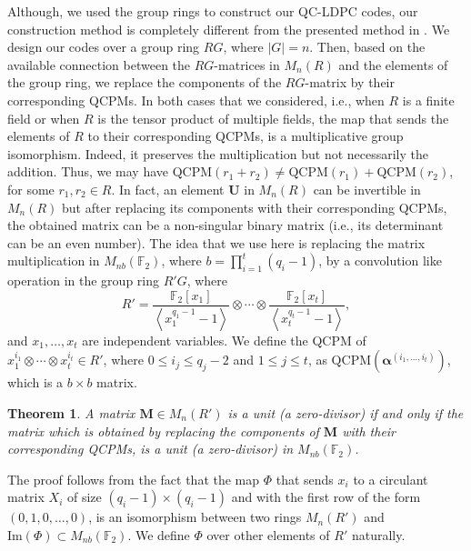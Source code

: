 \documentclass[journal,draftclsnofoot,onecolumn,12pt,twoside]{IEEEtran}
\newtheorem{theorem}{Theorem}
\begin{document}
Although, we  used the group rings to construct our QC-LDPC codes, our  construction method is completely different from the presented method in \cite{1}.  We design our codes over a group ring $RG$, where $|G|=n$. Then, based on the available connection  between the $RG$-matrices in $M_n(R)$ and the elements of the group ring, we replace the components of the $RG$-matrix by their corresponding QCPMs.
In both cases that we considered,  i.e., when $R$ is a finite field or when $R$ is the tensor product of multiple fields, the map that sends the elements of $R$ to their corresponding QCPMs, is a multiplicative group isomorphism. Indeed, it preserves  the multiplication but not necessarily the addition. Thus, we may have $\mathrm{QCPM} (r_1+r_2)\neq \mathrm{QCPM}(r_1)+\mathrm{QCPM}(r_2)$, for some $r_1,r_2\in R$. In fact, an element $\mathbf{U}$ in $M_n(R)$  can be invertible in $M_n(R)$  but after replacing its components with their corresponding QCPMs,  the obtained matrix can be a non-singular binary matrix (i.e., its determinant can be an even number). The idea that we use here is replacing the matrix multiplication in $M_{nb}(\mathbb{F}_2)$, where $b=\prod_{i=1}^t(q_i-1)$, by a convolution like operation in the group ring $R'G$, where
$$R'=\frac{\mathbb{F}_2[x_1]}{\left\langle x_1^{q_1-1}-1\right\rangle} \otimes \cdots\otimes \frac{\mathbb{F}_2[x_t]}{\left\langle x_t^{q_t-1}-1 \right\rangle},$$
and $x_1,\ldots, x_t$ are independent variables. We define the QCPM of $x_1^{i_1}\otimes \cdots\otimes  x_t^{i_t}\in R'$, where $0\leq i_j\leq q_j-2$ and $1\leq j\leq t$, as $\mathrm{QCPM}(\boldsymbol{\alpha}^{(i_1,\ldots,i_t)})$, which is a $b\times b$ matrix.
\begin{theorem}\label{th_11}
A matrix $\mathbf{M}\in M_n(R')$ is a unit (a zero-divisor) if and only if the matrix which is obtained by replacing the components of $\mathbf{M}$ with their corresponding QCPMs, is a unit (a zero-divisor) in $M_{nb}(\mathbb{F}_2)$.
\end{theorem}
\begin{IEEEproof}
The proof follows from the fact that the map $\Phi$ that sends $x_i$ to a circulant matrix $X_i$ of size $(q_i-1)\times (q_i-1)$ and with the first row of the form $(0,1,0,\ldots,0)$, is an isomorphism between two rings $M_n(R')$ and $\textrm{Im}(\Phi)\subset M_{nb}(\mathbb{F}_2)$. We  define $\Phi$ over other elements of $R'$ naturally.
\end{IEEEproof}
\end{document}
